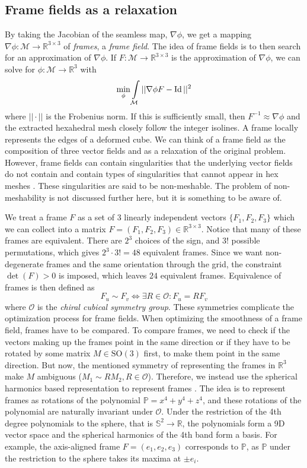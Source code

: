 \documentclass[../thesis.tex]{subfiles}
\begin{document}
\subsection{Frame fields as a relaxation}
By taking the Jacobian of the seamless map, $\nabla \phi$, we get a mapping
$\nabla \phi : \mathcal{M} \to \mathbb{R}^{3\times3}$ of \emph{frames}, a \emph{frame field}.
The idea of frame fields is to then search for an approximation of $\nabla \phi$.
If $F: \mathcal{M} \to \mathbb{R}^{3\times3}$ is the approximation of $\nabla \phi$, we can
solve for $\phi : \mathcal{M} \to \mathbb{R}^3$ with
\begin{equation}\label{eq:poisson}
  \min \limits_{\phi} \int \limits_{\mathcal{M}} ||\nabla \phi F - \Id||^2
\end{equation}
where $||\cdot||$ is the Frobenius norm. If this is sufficiently small, then $F^{-1} \approx \nabla \phi$ and 
the extracted hexahedral mesh closely follow the integer isolines.
A frame locally represents the edges of a deformed cube.
We can think of a frame field as the composition of three vector fields
and as a relaxation of the original problem. However, frame fields
can contain singularities that the underlying vector fields do not contain \cite{Nieser}
and contain types of singularities that cannot appear in hex meshes \cite{Liu}.
These singularities are said to be non-meshable.
The problem of non-meshability is not discussed further here, but it
is something to be aware of.

We treat a frame $F$ as a set of 3 linearly independent vectors $\{F_1,F_2,F_3 \}$ which we can
collect into a matrix $F=(F_1,F_2,F_3) \in \mathbb{R}^{3\times 3}$.
Notice that many of these frames are equivalent.
There are $2^3$ choices of the sign, and $3!$ possible permutations, which
gives $2^3\cdot 3! = 48$ equivalent frames.
Since we want non-degenerate frames and the same orientation through the grid, the constraint $\det(F)>0$ is imposed,
which leaves $24$ equivalent frames.
Equivalence of frames is then defined as
$$F_u \sim F_v \iff \exists R \in \mathcal{O} : F_u=RF_v$$
where $\mathcal{O}$ is the \emph{chiral cubical symmetry group}\cite{Nieser}.
These symmetries complicate the optimization process for frame fields.
When optimizing the smoothness of a frame field, frames have to be compared.
To compare frames, we need to check if the vectors making up
the frames point in the same direction or if they have to be rotated
by some matrix $M \in \mathrm{SO}(3)$ first, to make them point in the same direction.
But now, the mentioned symmetry of representing the frames in $\mathbb{R}^3$
make $M$ ambiguous (${M_1 \sim RM_2, R \in \mathcal{O}}$).
Therefore, we instead use the spherical harmonics based representation to represent frames \cite{Huang}.
The idea is to represent frames as rotations of the polynomial $\mathbb{P}=x^4+y^4+z^4$,
and these rotations of the polynomial are naturally invariant under $\mathcal{O}$.
Under the restriction of the 4th degree polynomials to the sphere, that is $\mathbb{S}^2\to \mathbb{R}$,
the polynomials form a 9D vector space and the spherical harmonics of the 4th band form a basis.
For example, the axis-aligned frame $F=(e_1,e_2,e_3)$ corresponds
to $\mathbb{P}$, as $\mathbb{P}$ under the restriction to the sphere takes its maxima at $\pm e_i$.
\end{document}
